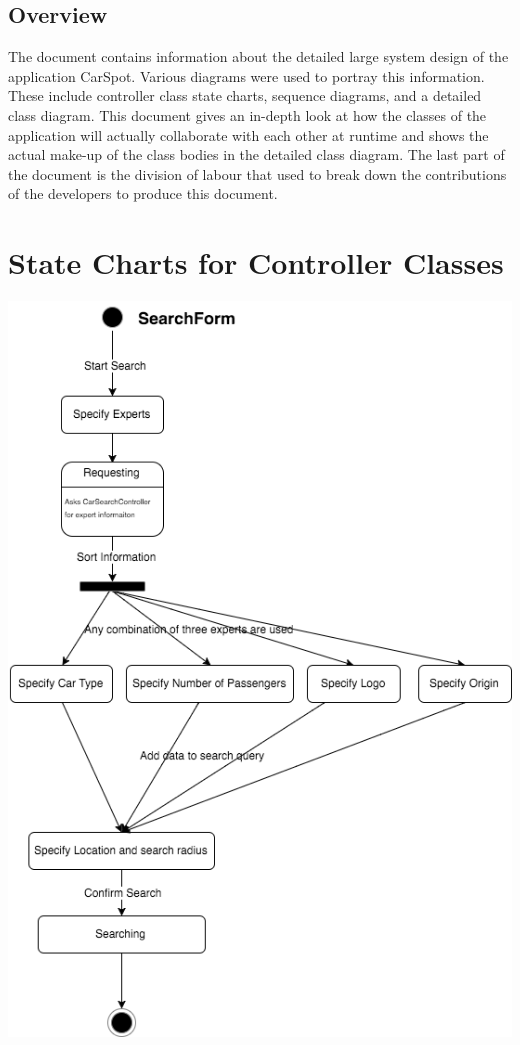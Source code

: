 \documentclass[12pt]{article}
\begin{document}
\subsection{Overview}
\label{sub:overview}
The document contains information about the detailed large system design of the application CarSpot. Various diagrams were used to portray this information. These include controller class state charts, sequence diagrams, and a detailed class diagram. This document gives an in-depth look at how the classes of the application will actually collaborate with each other at runtime and shows the actual make-up of the class bodies in the detailed class diagram. The last part of the document is the division of labour that used to break down the contributions of the developers to produce this document.


\section{State Charts for Controller Classes}
\includegraphics[scale=0.5]{searchForm-sd.png}\\
\end{document}
